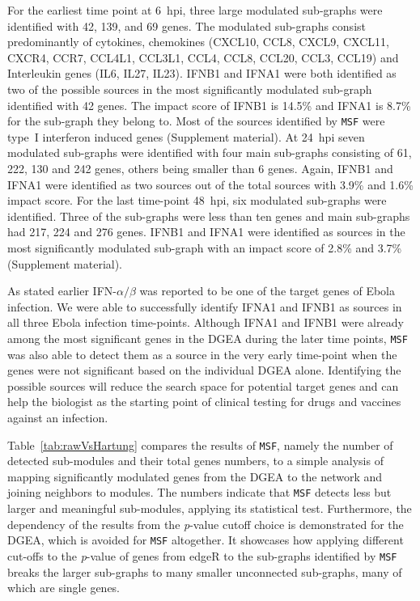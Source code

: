 \documentclass[10pt,a4paper,twocolumn]{article}
\begin{document}
	For the earliest time point at 6~hpi, three large modulated sub-graphs were identified with 42,
	139, and 69 genes.
	The modulated sub-graphs consist predominantly of cytokines, chemokines
	(CXCL10, CCL8, CXCL9, CXCL11, CXCR4, CCR7, CCL4L1, CCL3L1, CCL4, CCL8, CCL20, CCL3, CCL19) and Interleukin genes (IL6, IL27, IL23).
	IFNB1 and IFNA1 were both identified as two of the possible sources
	in the most significantly modulated sub-graph identified with 42 genes. The impact score of IFNB1 is 14.5\% and IFNA1 is 8.7\% for the sub-graph they belong to.
	Most of the sources identified by \texttt{MSF} were
	type~I interferon induced genes (Supplement material).
	At 24~hpi seven modulated sub-graphs were
	identified with four main sub-graphs consisting
	of 61, 222, 130 and 242 genes, others being smaller than 6 genes. Again, IFNB1
	and IFNA1 were identified as two sources out of the total sources with 3.9\% and 1.6\% impact score. For the last time-point 48~hpi,
	six modulated sub-graphs were identified. Three of the sub-graphs were
	less than ten genes and main sub-graphs had 217, 224 and 276 genes. IFNB1 and IFNA1 were identified as sources in
	the most significantly modulated sub-graph with an impact score of 2.8\% and 3.7\% (Supplement material).
	
	As stated earlier IFN-$\alpha / \beta$ was reported to be one of the target
	genes of Ebola infection. We were able to successfully identify IFNA1 and IFNB1 as
	sources in all three Ebola infection time-points. Although IFNA1 and IFNB1 were already among the most
	significant genes in the DGEA during the later time points, \texttt{MSF} was
	also able to detect them as a source in the very early time-point when the
	genes were not significant based on the individual DGEA alone. Identifying
	the possible sources will reduce the search space for potential target
	genes and can help the biologist as the starting point of clinical testing
	for drugs and vaccines against an infection.
	
	Table~\ref{tab:rawVsHartung} compares the results of \texttt{MSF}, namely
	the number of detected sub-modules and their total genes numbers, to a
	simple analysis of mapping significantly modulated genes from the DGEA to
	the network and joining neighbors to modules. The numbers indicate that
	\texttt{MSF} detects less but larger and meaningful sub-modules, applying its statistical
	test. Furthermore, the dependency of the results from the \textit{p}-value cutoff
	choice is demonstrated for the DGEA, which is avoided for \texttt{MSF}
	altogether. It showcases how applying different cut-offs to the \textit{p}-value of genes from edgeR to the sub-graphs identified by \texttt{MSF} breaks the larger sub-graphs to many smaller unconnected sub-graphs, many of which are single genes.
	
\end{document}
